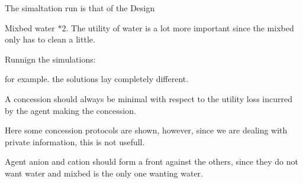 The simaltation run is that of the Design

Mixbed water *2. The utility of water is a lot more important since the mixbed only has to clean a little.

Runnign the simulations:

for example. the solutions lay completely different. 


\citet{endriss2006monotonic} A concession should always be minimal with respect to the utility loss incurred by the agent making the concession.

\citet{endriss2006monotonic} Here some concession protocols are shown,  however, since we are dealing with private information, this is not usefull. 


Agent anion and cation should form a front against the others, since they do not want water and mixbed is the only one wanting water.




















